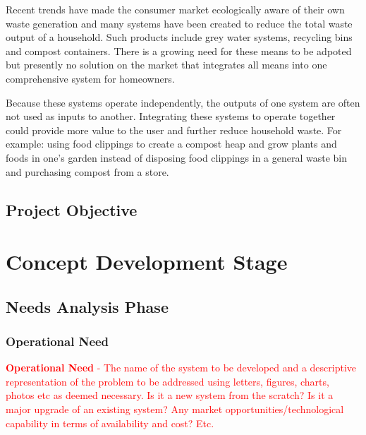 \documentclass[a4paper,11pt,fleqn]{report}
\begin{document}
Recent trends have made the consumer market ecologically aware of their own waste generation and many systems have been created to reduce the total waste output of a household. Such products include grey water systems, recycling bins and compost containers. There is a growing need for these means to be adpoted but presently no solution on the market that integrates all means into one comprehensive system for homeowners.
  
Because these systems operate independently, the outputs of one system are often not used as inputs to another. Integrating these systems to operate together could provide more value to the user and further reduce household waste. For example: using food clippings to create a compost heap and grow plants and foods in one's garden instead of disposing food clippings in a general waste bin and purchasing compost from a store.

\section{Project Objective} \label{sec: Project Objective}

\chapter{Concept Development Stage}
\section{Needs Analysis Phase} \label{sec: Needs Analysis Phase}
\subsection{Operational Need} \label{Ssec: Operational Need}
\textcolor{red}{\textbf{Operational Need} - The name of the system to be developed and a descriptive representation of the problem to be addressed using letters, figures, charts, photos etc as deemed necessary. Is it a new system from the scratch? Is it a major upgrade of an existing system? Any market opportunities/technological capability in terms of availability and cost? Etc.}
\end{document}
